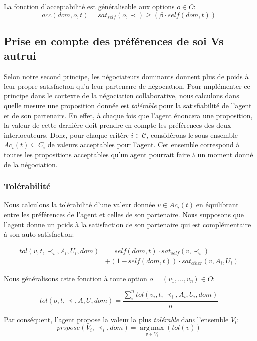 	
	
	La fonction d'acceptabilité est généralisable aux options $o \in O$:
	 $$acc(dom,o, t) = sat_{self}(o, \prec) \geq  (\beta \cdot self(dom,t))$$

	
	\subsection {Prise en compte des préférences de soi Vs autrui}
	Selon notre second principe, les négociateurs dominants donnent plus de poids à leur propre satisfaction qu'a leur partenaire de négociation. 
	Pour implémenter ce principe dans le contexte de la négociation collaborative, nous calculons dans quelle mesure une proposition donnée est \emph{tolérable} pour la satisfiabilité de l'agent et de son partenaire.
	En effet, à chaque fois que l'agent énoncera une proposition, la valeur de cette dernière doit prendre en compte les préférences des deux interlocuteurs. 
	Donc, pour chaque critère $i\in \mathcal{C}$, considérons le sous ensemble $Ac_i(t)\subseteq C_i$ de valeurs acceptables pour l'agent.
	Cet ensemble correspond à toutes les propositions acceptables qu'un agent pourrait faire à un moment donné de la négociation.
	
	\subsubsection{Tolérabilité}
	Nous calculons la tolérabilité d'une valeur donnée $ v \in Ac_i(t) $ en équilibrant entre les préférences de l'agent et celles de son partenaire. Nous supposons que l'agent donne un poids à la satisfaction de son partenaire qui est complémentaire à son auto-satisfaction:
	
	\begin{equation}
	\begin{split}
	tol(v, t, \prec_i, A_i, U_i, dom) & = self(dom, t)  \cdot sat_{self}(v, \prec_i) \\
	& +  (1 - self(dom, t)) \cdot sat_{other}(v, A_i, U_i)
	\end{split} 
	\end{equation}
	

	Nous généralisons cette fonction à toute option 
	$o = (v_1,\ldots,v_n) \in O$:
	
	\begin{equation}
	tol(o, t, \prec, A, U, dom) = \frac{ \sum_{i}^{n} tol(v_i, t, \prec_i, A_i, U_i, dom) } {n}
	\end{equation}
	
	\noindent
	Par conséquent, l'agent propose la valeur la plus \emph{tolérable} dans l'ensemble $V_i$:
	\begin{equation}
	propose(V_i, \prec_i,dom) =  \operatorname*{arg\,max}_{v \in V_i} ( tol(v))
	\end{equation}
	
